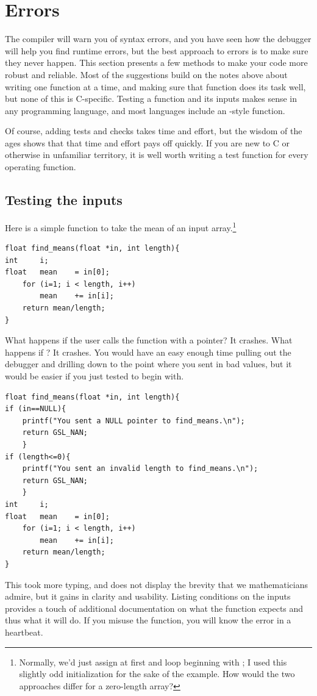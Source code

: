 \section{\treesymbol Errors} The compiler will warn you of syntax
errors, and you have seen how the debugger will help you find runtime
errors, but the best approach to errors is to make sure they never
happen. This section presents a few methods to make your code more
robust and reliable. Most of the suggestions build on the notes above
about writing one function at a time, and making sure that function does
its task well, but
none of this is C-specific. Testing a function and its inputs makes
sense in any programming language, and most languages include an 
-style function.

Of course, adding tests and checks takes time and effort, but the
wisdom of the ages shows that that time and effort pays off quickly.
If you are new to C or otherwise in unfamiliar territory, it is well
worth writing a test function for every operating function.


\subsection{Testing the inputs} Here is a simple function to take the
mean of an input array.\footnote{Normally, we'd just assign
 at first and loop beginning with ; I used this slightly odd initialization
for the sake of the example. How would the two approaches differ for a
zero-length array?}
\begin{lstlisting}
float find_means(float *in, int length){
int     i;
float   mean    = in[0];
    for (i=1; i < length, i++)
        mean    += in[i];
    return mean/length;
}
\end{lstlisting}

What happens if the user calls the function with a 
pointer? It crashes. What happens if ? It crashes.
You would have an easy enough time pulling out the debugger and drilling
down to the point where you sent in bad values, but it would be easier
if you just tested to begin with.
\begin{lstlisting}
float find_means(float *in, int length){
if (in==NULL){
    printf("You sent a NULL pointer to find_means.\n");
    return GSL_NAN;
    }
if (length<=0){
    printf("You sent an invalid length to find_means.\n");
    return GSL_NAN;
    }
int     i;
float   mean    = in[0];
    for (i=1; i < length, i++)
        mean    += in[i];
    return mean/length;
}
\end{lstlisting}
This took more typing, and does not display the brevity that we
mathematicians admire, but it gains in clarity and usability. Listing
conditions on the inputs provides a touch of additional documentation on
what the function expects and thus what it will do. If you misuse the
function, you will know the error in a heartbeat.

